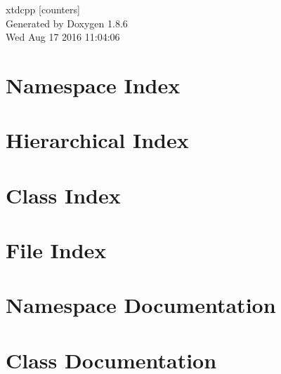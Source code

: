 \documentclass[twoside]{book}
\newcommand{\clearemptydoublepage}{%
  \newpage{\pagestyle{empty}\cleardoublepage}%
}
\begin{document}
\hypersetup{pageanchor=false}
\begin{titlepage}
\vspace*{7cm}
\begin{center}%
{\Large xtdcpp \mbox{[}counters\mbox{]} }\\
\vspace*{1cm}
{\large Generated by Doxygen 1.8.6}\\
\vspace*{0.5cm}
{\small Wed Aug 17 2016 11:04:06}\\
\end{center}
\end{titlepage}
\clearemptydoublepage
\tableofcontents
\clearemptydoublepage
{}
\hypersetup{pageanchor=true}

\chapter{Namespace Index}

\chapter{Hierarchical Index}

\chapter{Class Index}

\chapter{File Index}

\chapter{Namespace Documentation}


\chapter{Class Documentation}

















\end{document}
